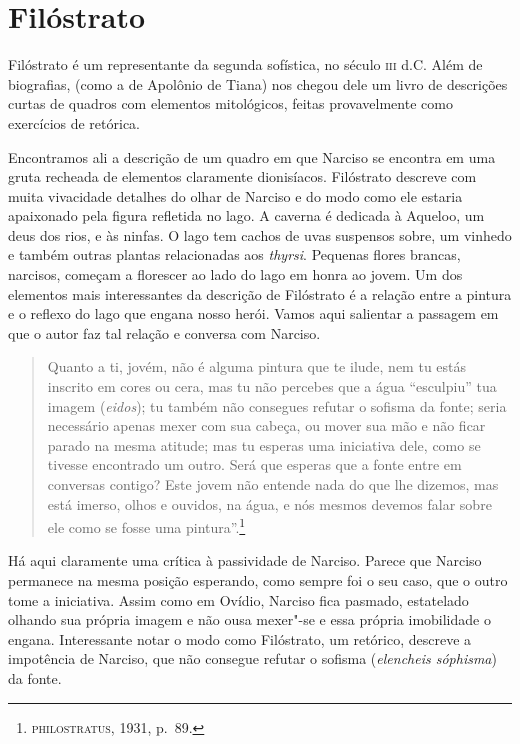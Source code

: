 \section{Filóstrato}

Filóstrato é um representante da segunda sofística, no século
\textsc{iii}
d.C. Além de biografias, (como a de Apolônio de Tiana) nos chegou
dele um livro de descrições curtas de quadros com elementos
mitológicos, feitas provavelmente como exercícios de retórica.

Encontramos ali a descrição de um quadro em que Narciso se
encontra em uma gruta recheada de elementos claramente dionisíacos.
Filóstrato descreve com muita vivacidade detalhes do olhar de Narciso
e do modo como ele estaria apaixonado pela figura refletida no lago.
A caverna é dedicada à Aqueloo, um deus dos rios, e às ninfas. O lago
tem cachos de uvas suspensos sobre, um vinhedo e também outras
plantas relacionadas aos \emph{thyrsi}. Pequenas flores brancas,
narcisos, começam a florescer ao lado do lago em honra ao jovem. Um
dos elementos mais interessantes da descrição de Filóstrato é a
relação entre a pintura e o reflexo do lago que engana nosso herói.
Vamos aqui salientar a passagem em que o autor faz tal relação e
conversa com Narciso.

\begin{quote}
Quanto a ti, jovém, não é alguma pintura que te ilude, nem tu estás
inscrito em cores ou cera, mas tu não percebes que a água “esculpiu”
tua imagem (\emph{eidos}); tu também não consegues refutar o
sofisma da fonte; seria necessário apenas mexer com sua cabeça, ou
mover sua mão e não ficar parado na mesma atitude; mas tu esperas uma
iniciativa dele, como se tivesse encontrado um outro. Será que
esperas que a fonte entre em conversas contigo? Este jovem não
entende nada do que lhe dizemos, mas está imerso, olhos e ouvidos, na
água, e nós mesmos devemos falar sobre ele como se fosse uma
pintura”.\footnote{ \textsc{philostratus}, 1931, p.~89.}
\end{quote}

Há aqui claramente uma crítica à passividade de Narciso. Parece
que Narciso permanece na mesma posição esperando, como sempre foi o
seu caso, que o outro tome a iniciativa. Assim como em Ovídio,
Narciso fica pasmado, estatelado olhando sua própria imagem e não
ousa mexer"-se e essa própria imobilidade o engana. Interessante notar
o modo como Filóstrato, um retórico, descreve a impotência de
Narciso, que não consegue refutar o sofisma (\emph{elencheis
sóphisma}) da fonte.

